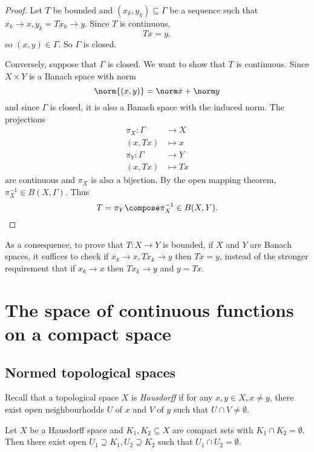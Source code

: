 \documentclass[a4paper]{article}
\begin{document}
\begin{proof}
  Let \(T\) be bounded and \((x_k, y_k) \subseteq \Gamma\) be a sequence such that \(x_k \to x, y_k = Tx_k \to y\). Since \(T\) is continuous,
  \[
    Tx = y,
  \]
  so \((x, y) \in \Gamma\). So \(\Gamma\) is closed.

  Conversely, suppose that \(\Gamma\) is closed. We want to show that \(T\) is continuous. Since \(X \times Y\) is a Banach space with norm
  \[
    \norm{(x, y)} = \norm x + \norm y
  \]
  and since \(\Gamma\) is closed, it is also a Banach space with the induced norm. The projections
  \begin{align*}
    \pi_X: \Gamma &\to X \\
    (x, Tx) &\mapsto x \\
    \pi_Y: \Gamma &\to Y \\
    (x, Tx) &\mapsto Tx
  \end{align*}
  are continuous and \(\pi_X\) is also a bijection. By the open mapping theorem, \(\pi_X^{-1} \in B(X, \Gamma)\). Thus
  \[
    T = \pi_Y \compose \pi_X^{-1} \in B(X, Y).
  \]
\end{proof}

\begin{remark}
  As a consequence, to prove that \(T: X \to Y\) is bounded, if \(X\) and \(Y\) are Banach spaces, it suffices to check if \(x_k \to x, Tx_k \to y\) then \(Tx = y\), instead of the stronger requirement that if \(x_k \to x\) then \(Tx_k \to y\) and \(y = Tx\).
\end{remark}

\section{The space of continuous functions on a compact space}

\subsection{Normed topological spaces}

Recall that a topological space \(X\) is \emph{Hausdorff} if for any \(x, y \in X, x \neq y\), there exist open neighbourhodds \(U\) of \(x\) and \(V\) of \(y\) such that \(U \cap V \neq \emptyset\).

\begin{proposition}
  Let \(X\) be a Hausdorff space and \(K_1, K_2 \subseteq X\) are compact sets with \(K_1 \cap K_2 = \emptyset\). Then there exist open \(U_1 \supseteq K_1, U_2 \supseteq K_2\) such that \(U_1 \cap U_2 = \emptyset\).
\end{proposition}
\end{document}
